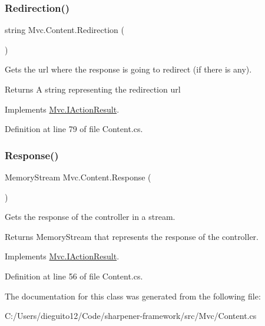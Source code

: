 \subsubsection{\texorpdfstring{Redirection()}{Redirection()}}
{\footnotesize\ttfamily string Mvc.\+Content.\+Redirection (\begin{DoxyParamCaption}{ }\end{DoxyParamCaption})}



Gets the url where the response is going to redirect (if there is any). 

\begin{DoxyReturn}{Returns}
A string representing the redirection url
\end{DoxyReturn}


Implements \hyperlink{interface_mvc_1_1_i_action_result_a036707da116ea300eae90e105b8d1ced}{Mvc.\+I\+Action\+Result}.



Definition at line 79 of file Content.\+cs.

\mbox{\label{class_mvc_1_1_content_aabe147bc684eed8af000906fbfe92b61}} 
\subsubsection{\texorpdfstring{Response()}{Response()}}
{\footnotesize\ttfamily Memory\+Stream Mvc.\+Content.\+Response (\begin{DoxyParamCaption}{ }\end{DoxyParamCaption})}



Gets the response of the controller in a stream. 

\begin{DoxyReturn}{Returns}
Memory\+Stream that represents the response of the controller.
\end{DoxyReturn}


Implements \hyperlink{interface_mvc_1_1_i_action_result_a7cf7423071384c7b2bac75a5f4d6e25c}{Mvc.\+I\+Action\+Result}.



Definition at line 56 of file Content.\+cs.



The documentation for this class was generated from the following file\+:\begin{DoxyCompactItemize}
\item 
C\+:/\+Users/dieguito12/\+Code/sharpener-\/framework/src/\+Mvc/Content.\+cs\end{DoxyCompactItemize}
